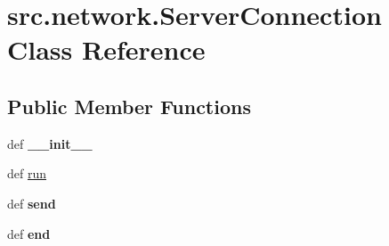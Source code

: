 \hypertarget{classsrc_1_1network_1_1_server_connection}{\section{src.\-network.\-Server\-Connection \-Class \-Reference}
\label{classsrc_1_1network_1_1_server_connection}
}
\subsection*{\-Public \-Member \-Functions}
\begin{DoxyCompactItemize}
\item 
\hypertarget{classsrc_1_1network_1_1_server_connection_a4c5668c5a8a9a4a465c62b028a643221}{def {\bfseries \-\_\-\-\_\-init\-\_\-\-\_\-}}\label{classsrc_1_1network_1_1_server_connection_a4c5668c5a8a9a4a465c62b028a643221}

\item 
def \hyperlink{classsrc_1_1network_1_1_server_connection_a3145a5740f6734de3a319e3b445ca7ca}{run}
\item 
\hypertarget{classsrc_1_1network_1_1_server_connection_a68a0541f7a7e13f4726466e4cd297d5b}{def {\bfseries send}}\label{classsrc_1_1network_1_1_server_connection_a68a0541f7a7e13f4726466e4cd297d5b}

\item 
\hypertarget{classsrc_1_1network_1_1_server_connection_a777b7accc07bd992a27166811c0f79ff}{def {\bfseries end}}\label{classsrc_1_1network_1_1_server_connection_a777b7accc07bd992a27166811c0f79ff}

\end{DoxyCompactItemize}
